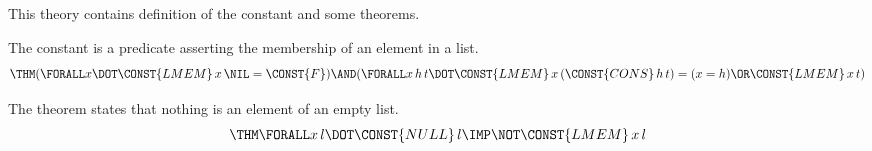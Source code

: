 
This theory contains definition of the constant  and some theorems.


The constant  is a predicate asserting the membership of an
element in a list.
\begin{equation}
\THM (\FORALL x\DOT \CONST{LMEM} \,x \,\NIL  = \CONST{F}) \AND 
     (\FORALL x \,h \,t\DOT \CONST{LMEM} \,x \,(\CONST{CONS} \,h \,t) =
                               (x = h) \OR  \CONST{LMEM} \,x \,t)
\end{equation}
\begin{comment} 
\pline{}{let\ LMEM\char"5F DEF\ =\ new\char"5F list\char"5F rec\char"5F definition(\char"60 LMEM\char"5F DEF\char"60 ,}
\pline{}{\ "(LMEM\ x\ []\ =\ F)\ /\char"5C }
\pline{}{\ \ (LMEM\ x\ (CONS\ (h:*)\ t)\ =\ (x\ =\ h)\ \char"5C /\ (LMEM\ x\ t))");;}
\end{comment}


The theorem  states that nothing is an element
of an empty list. 
\begin{equation}
\THM \FORALL x \,l\DOT \CONST{NULL} \,l \IMP  \NOT \CONST{LMEM} \,x \,l
\end{equation}
\begin{comment} 
\pline{}{let\ NULL\char"5F NOT\char"5F LMEM\ =\ prove\char"5F thm(\char"60 NULL\char"5F NOT\char"5F LMEM\char"60 ,}
\pline{}{\ \ \ \ "!(x:*)\ l.\ NULL\ l\ ==>\ \char"7E (LMEM\ x\ l)",}
\pline{}{\ \ \ \ GEN\char"5F TAC\ THEN\ LIST\char"5F INDUCT\char"5F TAC\ THEN\ REWRITE\char"5F TAC[NULL;LMEM\char"5F DEF]);;}
\end{comment}

